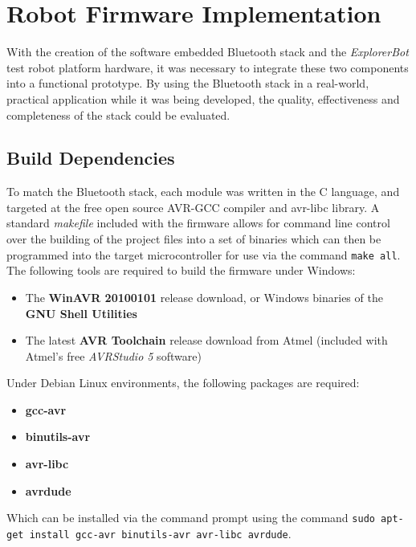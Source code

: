 \chapter{Robot Firmware Implementation}
\label{chp:robotfwimp}

With the creation of the software embedded Bluetooth stack and the \textit{ExplorerBot} test robot platform hardware, it was necessary to integrate these two components into a functional prototype. By using the Bluetooth stack in a real-world, practical application while it was being developed, the quality, effectiveness and completeness of the stack could be evaluated.

\section{Build Dependencies}

To match the Bluetooth stack, each module was written in the C language, and targeted at the free open source AVR-GCC compiler and avr-libc library. A standard \textit{makefile} included with the firmware allows for command line control over the building of the project files into a set of binaries which can then be programmed into the target microcontroller for use via the command \texttt{make all}. The following tools are required to build the firmware under Windows:

\begin{itemize}
	\item The \textbf{WinAVR 20100101} release download, or Windows binaries of the \textbf{GNU Shell Utilities}
	\item The latest \textbf{AVR Toolchain} release download from Atmel (included with Atmel's free \textit{AVRStudio 5} software)
\end{itemize}

Under Debian Linux environments, the following packages are required:

\begin{itemize}
	\item \textbf{gcc-avr} 
	\item \textbf{binutils-avr}
	\item \textbf{avr-libc}
	\item \textbf{avrdude}
\end{itemize}

Which can be installed via the command prompt using the command \texttt{sudo apt-get install gcc-avr binutils-avr avr-libc avrdude}.

